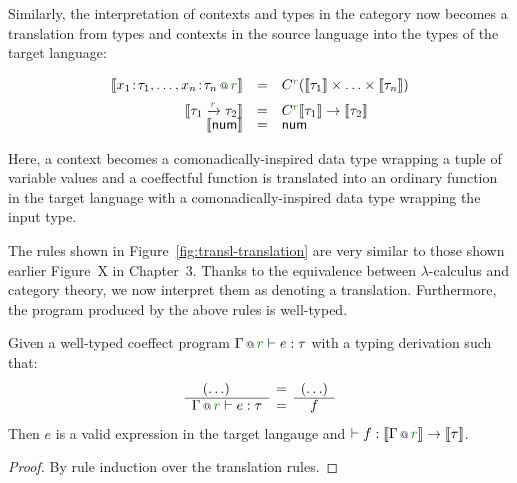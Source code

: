 Similarly, the interpretation of contexts and types in the category now becomes a translation from types and
contexts in the source language into the types of the target language:

\begin{equation*}
\begin{array}{rcl}
\sem{\coctx{x_1\!:\!\tau_1, \ldots, x_n\!:\!\tau_n}{\cclrd{r}}} &=& \ctyp{\cclrd{r}}{(\sem{\tau_1} \times \ldots \times \sem{\tau_n})} \\[0.5em]
\sem{\tau_1 \xrightarrow{\cclrd{r}} \tau_2} & = & \ctyp{\cclrd{r}}{\sem{\tau_1}} \rightarrow \sem{\tau_2} \\[-0.2em]
\sem{\ident{num}} & = & \ident{num} \\
\end{array}
\end{equation*}

Here, a context becomes a comonadically-inspired data type wrapping a tuple of variable values 
and a coeffectful function is translated into an ordinary function in the target language
with a comonadically-inspired data type wrapping the input type.

The rules shown in Figure~\ref{fig:transl-translation} are very similar to those shown earlier
Figure~X in Chapter~3. Thanks to the equivalence between $\lambda$-calculus and category theory,
we now interpret them as denoting a translation. Furthermore, the program produced by the above
rules is well-typed.

\begin{lemma}
Given a well-typed coeffect program $\coctx{\Gamma}{\cclrd{r}} \vdash e : \tau$ with a 
typing derivation such that:
%  
\begin{equation*}  
  \semdeff
    {(\ldots)\qquad~}
    {\coctx{\Gamma}{\cclrd{r}} \vdash e : \tau }
    {(\ldots)}
    { ~~f }
\end{equation*}  
%
Then $e$ is a valid expression in the target langauge and $\vdash f : \sem{\coctx{\Gamma}{\cclrd{r}}} \rightarrow \sem{\tau}$.
\end{lemma}
\begin{proof}
  By rule induction over the translation rules.
\end{proof}


